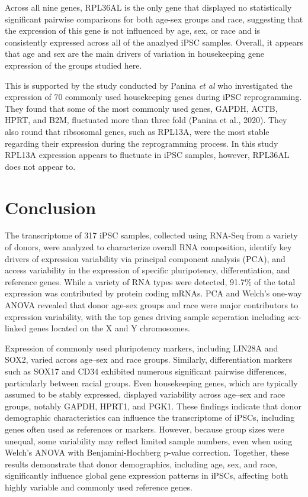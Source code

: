 \documentclass[
  letterpaper,
  DIV=11,
  numbers=noendperiod]{scrartcl}
\begin{document}
Across all nine genes, RPL36AL is the only gene that displayed no
statistically significant pairwise comparisons for both age-sex groups
and race, suggesting that the expression of this gene is not influenced
by age, sex, or race and is consistently expressed across all of the
anazlyed iPSC samples. Overall, it appears that age and sex are the main
drivers of variation in housekeeping gene expression of the groups
studied here.

This is supported by the study conducted by Panina \emph{et al} who
investigated the expression of 70 commonly used housekeeping genes
during iPSC reprogramming. They found that some of the most commonly
used genes, GAPDH, ACTB, HPRT, and B2M, fluctuated more than three fold
(Panina et al., 2020). They also round that ribsosomal genes, such as
RPL13A, were the most stable regarding their expression during the
reprogramming process. In this study RPL13A expression appears to
fluctuate in iPSC samples, however, RPL36AL does not appear to.

\section{Conclusion}\label{conclusion}

The transcriptome of 317 iPSC samples, collected using RNA-Seq from a
variety of donors, were analyzed to characterize overall RNA
composition, identify key drivers of expression variability via
principal component analysis (PCA), and access variability in the
expression of specific pluripotency, differentiation, and reference
genes. While a variety of RNA types were detected, 91.7\% of the total
expression was contributed by protein coding mRNAs. PCA and Welch's
one-way ANOVA revealed that donor age-sex groups and race were major
contributors to expression variability, with the top genes driving
sample seperation including sex-linked genes located on the X and Y
chromosomes.

Expression of commonly used pluripotency markers, including LIN28A and
SOX2, varied across age--sex and race groups. Similarly, differentiation
markers such as SOX17 and CD34 exhibited numerous significant pairwise
differences, particularly between racial groups. Even housekeeping
genes, which are typically assumed to be stably expressed, displayed
variability across age--sex and race groups, notably GAPDH, HPRT1, and
PGK1. These findings indicate that donor demographic characteristics can
influence the transcriptome of iPSCs, including genes often used as
references or markers. However, because group sizes were unequal, some
variability may reflect limited sample numbers, even when using Welch's
ANOVA with Benjamini-Hochberg p-value correction. Together, these
results demonstrate that donor demographics, including age, sex, and
race, significantly influence global gene expression patterns in iPSCs,
affecting both highly variable and commonly used reference genes.
\end{document}
